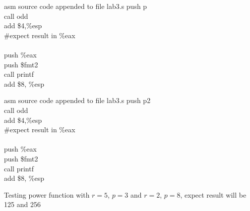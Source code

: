 \documentclass{article}
\begin{document}
 \begin{multicols}{2}
\begin{GFT}{asm source code appended to file lab3.s}
\+  push p\\
\+  call odd\\
\+  add \$4,\%esp\\
\+  \#expect result in \%eax\\
\+\\
\+  push \%eax\\
\+  push \$fmt2\\
\+  call printf\\
\+  add \$8, \%esp\\
\end{GFT}
\columnbreak
\begin{GFT}{asm source code appended to file lab3.s}
\+  push p2\\
\+  call odd\\
\+  add \$4,\%esp\\
\+  \#expect result in \%eax\\
\+\\
\+  push \%eax\\
\+  push \$fmt2\\
\+  call printf\\
\+  add \$8, \%esp\\
\end{GFT}
\end{multicols}
Testing power function with $r =5$, $p = 3$ and $r =2$, $p = 8$, expect result will be 125 and 256
\end{document}

